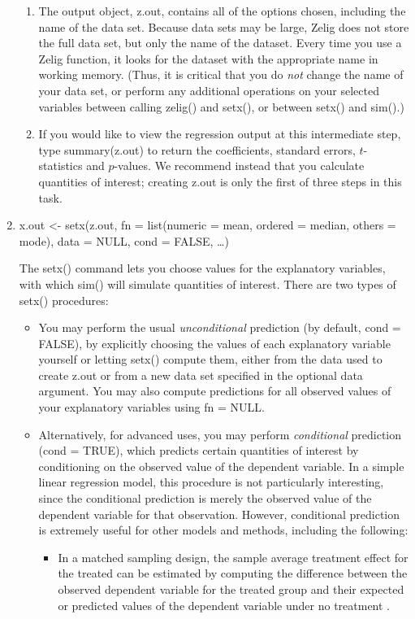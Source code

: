 \documentclass[letterpaper,10pt,english]{sphinxmanual}
\begin{document}
\begin{enumerate}
\begin{enumerate}
\item {} 
The output object, z.out, contains all of the options chosen,
including the name of the data set. Because data sets may be
large, Zelig does not store the full data set, but only the name
of the dataset. Every time you use a Zelig function, it looks for
the dataset with the appropriate name in working memory. (Thus, it
is critical that you do \emph{not} change the name of your data set, or
perform any additional operations on your selected variables
between calling zelig() and setx(), or between setx() and sim().)

\item {} 
If you would like to view the regression output at this
intermediate step, type summary(z.out) to return the coefficients,
standard errors, \(t\)-statistics and \(p\)-values. We
recommend instead that you calculate quantities of interest;
creating z.out is only the first of three steps in this task.

\end{enumerate}

\item {} 
x.out \textless{}- setx(z.out, fn = list(numeric = mean, ordered = median,
others = mode), data = NULL, cond = FALSE, …)

The setx() command lets you choose values for the explanatory
variables, with which sim() will simulate quantities of interest.
There are two types of setx() procedures:
\begin{itemize}
\item {} 
You may perform the usual \emph{unconditional} prediction (by default,
cond = FALSE), by explicitly choosing the values of each
explanatory variable yourself or letting setx() compute them,
either from the data used to create z.out or from a new data set
specified in the optional data argument. You may also compute
predictions for all observed values of your explanatory variables
using fn = NULL.

\item {} 
Alternatively, for advanced uses, you may perform \emph{conditional}
prediction (cond = TRUE), which predicts certain quantities of
interest by conditioning on the observed value of the dependent
variable. In a simple linear regression model, this procedure is
not particularly interesting, since the conditional prediction is
merely the observed value of the dependent variable for that
observation. However, conditional prediction is extremely useful
for other models and methods, including the following:
\begin{itemize}
\item {} 
In a matched sampling design, the sample average treatment
effect for the treated can be estimated by computing the
difference between the observed dependent variable for the
treated group and their expected or predicted values of the
dependent variable under no treatment .


\end{itemize}
\end{itemize}
\end{enumerate}
\end{document}
